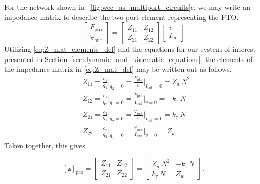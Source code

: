 \documentclass[5p,times]{elsarticle}
\begin{document}
For the network shown in \figurename~\ref{fig:wec_as_multiport_circuits}c, we may write an impedance matrix to describe the two-port element representing the PTO.
%
\begin{equation}
        \label{eq:Z_mat_def}
        \begin{bmatrix} 
                F_{\textrm{pto}} \\
                \forall_{\textrm{out}} 
        \end{bmatrix} 
        = 
        \begin{bmatrix} 
                Z_{11} & Z_{12} \\ 
                Z_{21} & Z_{22} 
        \end{bmatrix} 
        \begin{bmatrix} 
                v \\
                I_{\textrm{in}} 
        \end{bmatrix}
\end{equation}
%
Utilizing \eqref{eq:Z_mat_elements_def} and the equations for our system of interest presented in Section~\ref{sec:dynamic_and_kinematic_equations}, the elements of the impedance matrix in \eqref{eq:Z_mat_def} may be written out as follows.
%
\begin{subequations}
        \begin{align}
                &Z_{11} = \frac{e_1}{q_1} \bigg \vert_{q_2=0} 
                = \frac{F_{\textrm{pto}}}{v} \bigg \vert_{I_{\textrm{out}}=0} = Z_d \, N^2 \\[0.5em]
                &Z_{12} = \frac{e_1}{q_2} \bigg \vert_{q_1=0} 
                = \frac{F_{\textrm{pto}}}{I_{\textrm{out}}} \bigg \vert_{v=0} = -k_\tau \, N \\[0.5em]
                &Z_{21} = \frac{e_2}{q_1} \bigg \vert_{q_2=0} 
                = \frac{\forall_{\textrm{out}}}{v} \bigg \vert_{I_{\textrm{out}}=0} = k_\tau \, N \\[0.5em]
                &Z_{22} = \frac{e_2}{q_2} \bigg \vert_{q_1=0} 
                = \frac{\forall_{\textrm{out}}}{I_{\textrm{out}}} \bigg \vert_{v=0} = Z_w 
        \end{align}
\end{subequations}
%
Taken together, this gives 

\begin{equation}
        \left[ \mathbf{z} \right]_{\textrm{pto}} 
        = 
        \begin{bmatrix} 
                Z_{11} & Z_{12} \\ 
                Z_{21} & Z_{22} 
        \end{bmatrix}
        =
        \begin{bmatrix} 
        Z_d \, N^2      & -k_\tau \, N  \\
        k_\tau \, N     & Z_w
        \end{bmatrix}.
        \label{eq:pto_impedance}
\end{equation}
\end{document}
